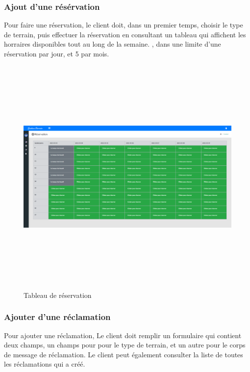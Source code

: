 \documentclass[a4paper]{report}
\begin{document}
\begin{spacing}{2}
\subsubsection{Ajout d'une résérvation}
Pour faire une réservation, le client doit, dans un premier temps, choisir le type de terrain, puis effectuer la réservation en consultant un tableau qui affichent les horraires disponibles  tout au long de la semaine. 
, dans une limite d'une réservation par jour, et 5 par mois.
\begin{figure}[!ht]
\begin{center}
\includegraphics[width=18cm,height=12cm]{Screenshots/Reservation-Client.png}
\end{center}
\caption[Tableau de réservation]{Tableau de réservation}
\end{figure}

\subsubsection{Ajouter d'une réclamation}
Pour ajouter une réclamation, Le client doit remplir un formulaire qui contient deux champs, un champs pour pour le type de terrain, et un autre pour le corps de message de réclamation.
Le client peut également consulter la liste de toutes les réclamations qui a créé.
\cleardoublepage



\end{spacing}
\end{document}
